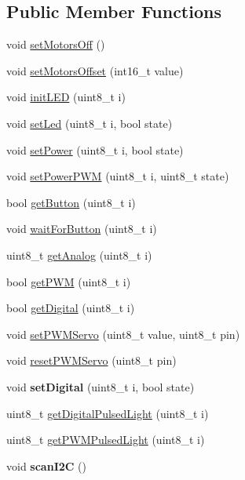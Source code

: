 \subsection*{Public Member Functions}
\begin{DoxyCompactItemize}
\item 
void \hyperlink{class_goldboard4_a78c077cd2b846533cf1134f23dd2db79}{set\+Motors\+Off} ()
\item 
void \hyperlink{class_goldboard4_ac782bb10887e4cd6e58fcbe7b7d65623}{set\+Motors\+Offset} (int16\+\_\+t value)
\item 
void \hyperlink{class_goldboard4_a0c3134553d7136d32d46ea4641079c93}{init\+L\+ED} (uint8\+\_\+t i)
\item 
void \hyperlink{class_goldboard4_aedbe5a314f43d0da6dfed1bbb23b5ca2}{set\+Led} (uint8\+\_\+t i, bool state)
\item 
void \hyperlink{class_goldboard4_a09f18b8381af7830c2dc4214a6d84fbc}{set\+Power} (uint8\+\_\+t i, bool state)
\item 
void \hyperlink{class_goldboard4_a7fce81b6d0c23129da6e361badaefdf4}{set\+Power\+P\+WM} (uint8\+\_\+t i, uint8\+\_\+t state)
\item 
bool \hyperlink{class_goldboard4_aaf6ac85d732d07ffaa3ba88bed461a9a}{get\+Button} (uint8\+\_\+t i)
\item 
void \hyperlink{class_goldboard4_a2a83bb33f819b913fd63a95fe9a97bde}{wait\+For\+Button} (uint8\+\_\+t i)
\item 
uint8\+\_\+t \hyperlink{class_goldboard4_a81c498c9cfa45e7cc04883e561c24921}{get\+Analog} (uint8\+\_\+t i)
\item 
bool \hyperlink{class_goldboard4_a72afec46aecbca276d29e714ac5ab1b7}{get\+P\+WM} (uint8\+\_\+t i)
\item 
bool \hyperlink{class_goldboard4_a4fa6316d58b1e6b5b8174ee748b41216}{get\+Digital} (uint8\+\_\+t i)
\item 
void \hyperlink{class_goldboard4_a43c453224e2b6c04dbf040e82b419c50}{set\+P\+W\+M\+Servo} (uint8\+\_\+t value, uint8\+\_\+t pin)
\item 
void \hyperlink{class_goldboard4_afa78c637a7b8db1eae0eb8b3792f71e4}{reset\+P\+W\+M\+Servo} (uint8\+\_\+t pin)
\item 
void {\bfseries set\+Digital} (uint8\+\_\+t i, bool state)\hypertarget{class_goldboard4_a15872524d69b69fec2b00c63a90e5221}{}\label{class_goldboard4_a15872524d69b69fec2b00c63a90e5221}

\item 
uint8\+\_\+t \hyperlink{class_goldboard4_ac4f9d6eb4d800c68bffc065913427c73}{get\+Digital\+Pulsed\+Light} (uint8\+\_\+t i)
\item 
uint8\+\_\+t \hyperlink{class_goldboard4_abaedef75924a199b7779ce37028f11f8}{get\+P\+W\+M\+Pulsed\+Light} (uint8\+\_\+t i)
\item 
void {\bfseries scan\+I2C} ()\hypertarget{class_goldboard4_a7bb4ac08dc90ad14adb519a529519048}{}\label{class_goldboard4_a7bb4ac08dc90ad14adb519a529519048}

\end{DoxyCompactItemize}
